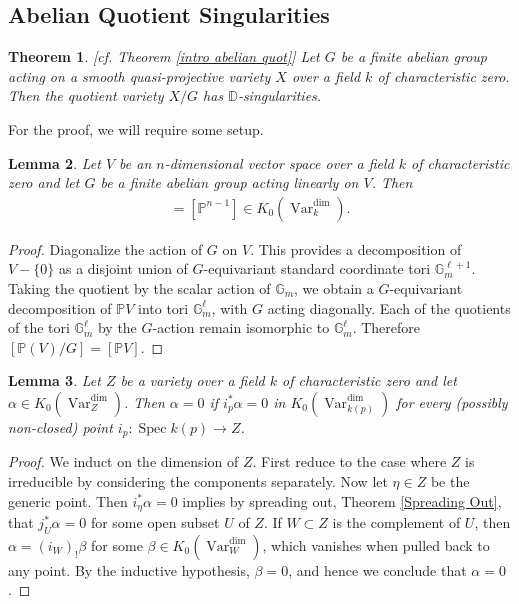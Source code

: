 \documentclass{amsart}
\newtheorem{thm}{Theorem}[section]
\newtheorem{lem}[thm]{Lemma}
\theoremstyle{definition}
\DeclareMathOperator{\Var}{Var}
\numberwithin{equation}{section}
\begin{document}
\subsection{Abelian Quotient Singularities}

\begin{thm}\label{abelian sing}[cf. Theorem \ref{intro abelian quot}]
Let $G$ be a finite abelian group acting on a smooth quasi-projective variety $X$ over a field $k$ of characteristic zero. Then the quotient variety $X/G$ has $\mathbb{D}$-singularities. 
\end{thm}

For the proof, we will require some setup.

\begin{lem}\label{vector space}
Let $V$ be an $n$-dimensional vector space over a field $k$ of characteristic zero and let $G$ be a finite abelian group acting linearly on $V$. Then
\begin{align*}
    [\mathbb{P}(V)/G] = [\mathbb{P}^{n-1}] \in K_0(\Var_k^{\dim}).
\end{align*}
\end{lem}

\begin{proof}
Diagonalize the action of $G$ on $V$. This provides a decomposition of $V- \{ 0 \}$ as a disjoint union of $G$-equivariant standard coordinate tori $\mathbb{G}_{m}^{\ell+1}$. Taking the quotient by the scalar action of $\mathbb{G}_{m}$, we obtain a $G$-equivariant decomposition of $\mathbb{P}V$ into tori $\mathbb{G}_{m}^\ell$, with $G$ acting diagonally. Each of the quotients of the tori $\mathbb{G}_{m}^\ell$ by the $G$-action remain isomorphic to $\mathbb{G}_{m}^\ell$. Therefore $[\mathbb{P}(V)/G] = [\mathbb{P}V]$.
\end{proof}


\begin{lem}\label{pointwise}
Let $Z$ be a variety over a field $k$ of characteristic zero and let $\alpha \in K_0(\Var_Z^{\dim})$. Then $\alpha = 0$ if $i_p^* \alpha = 0$ in $K_0(\Var_{k(p)}^{\dim})$ for every (possibly non-closed) point $i_p: \mathop{\mathrm{Spec}}k(p) \rightarrow Z$.
\end{lem}

\begin{proof}
We induct on the dimension of $Z$. First reduce to the case where $Z$ is irreducible by considering the components separately. Now let $\eta \in Z$ be the generic point. Then $i_\eta^* \alpha = 0$ implies by spreading out, Theorem \ref{Spreading Out}, that $j_U^* \alpha = 0$ for some open subset $U$ of $Z$. If $W \subset Z$ is the complement of $U$, then $\alpha = (i_W)_! \beta$ for some $\beta \in K_0(\Var_W^{\dim})$, which vanishes when pulled back to any point. By the inductive hypothesis, $\beta = 0$, and hence we conclude that $\alpha = 0$.
\end{proof}
\end{document}
